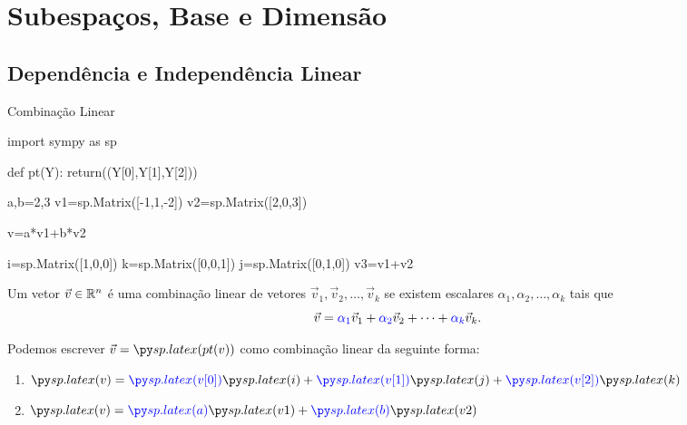 \section{Subespaços, Base e Dimensão}

\subsection*{Dependência e Independência Linear}

\begin{frame}[label=lild,fragile]{Combinação Linear}
\begin{pycode} 
import sympy as sp

def pt(Y):
 return((Y[0],Y[1],Y[2]))


a,b=2,3
v1=sp.Matrix([-1,1,-2])
v2=sp.Matrix([2,0,3])

v=a*v1+b*v2

i=sp.Matrix([1,0,0])
k=sp.Matrix([0,0,1])
j=sp.Matrix([0,1,0])
v3=v1+v2

\end{pycode} 
\begin{defin}
Um vetor $\vec{v}\in \mathbb{R}^n$ é uma {\color{blue} combinação linear} de vetores $\vec{v}_1, \vec{v}_2, \ldots, \vec{v}_k$ se existem escalares {\color{blue}$\alpha_1,\alpha_2,\ldots, \alpha_k$} tais que
\[\vec{v}={\color{blue}\alpha_1}\vec{v}_1+{\color{blue}\alpha_2}\vec{v}_2+\cdots +{\color{blue}\alpha_k}\vec{v}_k.\]
\end{defin}

\begin{exe}
Podemos escrever  \(\vec{v}=\pyl{pt(v)}\) como combinação linear da seguinte forma:
\begin{enumerate}
\item \(\pyl{v}={\color{blue}\pyl{v[0]}}\pyl{i}+{\color{blue}\pyl{v[1]}}\pyl{j}+{\color{blue}\pyl{v[2]}}\pyl{k}\)
\item \(\pyl{v}={\color{blue}\pyl{a}}\pyl{v1}+{\color{blue}\pyl{b}}\pyl{v2}\)
\end{enumerate}
\end{exe}

\end{frame}

